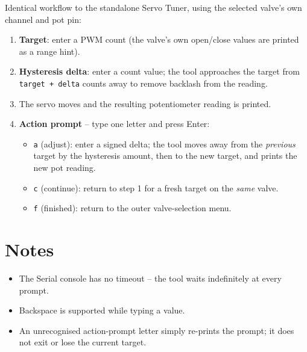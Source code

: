 \documentclass[11pt,letterpaper]{article}
\begin{document}
Identical workflow to the standalone Servo Tuner, using the selected
valve's own channel and pot pin:

\begin{sloppypar}
\begin{enumerate}[nosep]
  \item \textbf{Target}: enter a PWM count (the valve's own open/close
        values are printed as a range hint).
  \item \textbf{Hysteresis delta}: enter a count value; the tool
        approaches the target from \texttt{target~+~delta} counts away
        to remove backlash from the reading.
  \item The servo moves and the resulting potentiometer reading is
        printed.
  \item \textbf{Action prompt} -- type one letter and press Enter:
        \begin{itemize}[nosep]
          \item \texttt{a} (adjust): enter a signed delta; the tool moves
                away from the \emph{previous} target by the hysteresis
                amount, then to the new target, and prints the new pot
                reading.
          \item \texttt{c} (continue): return to step 1 for a fresh
                target on the \emph{same} valve.
          \item \texttt{f} (finished): return to the outer valve-selection
                menu.
        \end{itemize}
\end{enumerate}
\end{sloppypar}

\section{Notes}

\begin{itemize}[nosep]
  \item The Serial console has no timeout -- the tool waits indefinitely
        at every prompt.
  \item Backspace is supported while typing a value.
  \item An unrecognised action-prompt letter simply re-prints the prompt;
        it does not exit or lose the current target.
\end{itemize}
\end{document}
